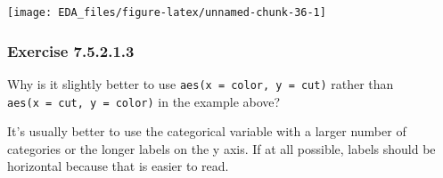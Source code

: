 \documentclass[]{book}
\newenvironment{Shaded}{\begin{snugshade}}{\end{snugshade}}
\newcommand{\DataTypeTok}[1]{\textcolor[rgb]{0.13,0.29,0.53}{#1}}
\newcommand{\DecValTok}[1]{\textcolor[rgb]{0.00,0.00,0.81}{#1}}
\newcommand{\KeywordTok}[1]{\textcolor[rgb]{0.13,0.29,0.53}{\textbf{#1}}}
\newcommand{\NormalTok}[1]{#1}
\newcommand{\OperatorTok}[1]{\textcolor[rgb]{0.81,0.36,0.00}{\textbf{#1}}}
\newcommand{\OtherTok}[1]{\textcolor[rgb]{0.56,0.35,0.01}{#1}}
\newcommand{\StringTok}[1]{\textcolor[rgb]{0.31,0.60,0.02}{#1}}
\theoremstyle{plain}
\theoremstyle{remark}
\begin{document}
\begin{Shaded}
\end{Shaded}

\begin{center}\texttt{[image: EDA\_files/figure-latex/unnamed-chunk-36-1]} \end{center}

\hypertarget{exercise-7.5.2.1.3}{%
\subsubsection*{\texorpdfstring{Exercise {7.5.2.1.3}}{Exercise 7.5.2.1.3}}\label{exercise-7.5.2.1.3}}

Why is it slightly better to use \texttt{aes(x\ =\ color,\ y\ =\ cut)} rather than \texttt{aes(x\ =\ cut,\ y\ =\ color)} in the example above?

It's usually better to use the categorical variable with a larger number of categories or the longer labels on the y axis.
If at all possible, labels should be horizontal because that is easier to read.
\end{document}
